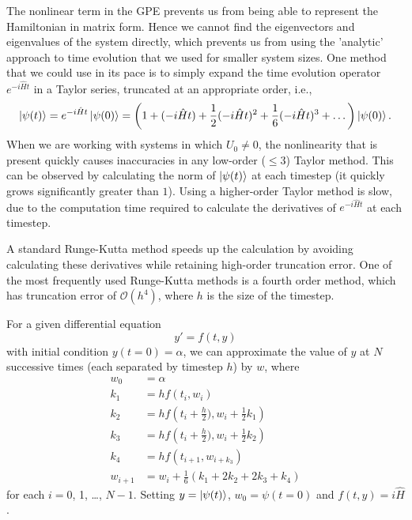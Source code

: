 \documentclass[a4paper, 10pt]{article}
\theoremstyle{plain}
\begin{document}
The nonlinear term in the GPE prevents us from being able to represent the
Hamiltonian in matrix form. Hence we cannot find the eigenvectors and
eigenvalues of the system directly, which prevents us from using the 'analytic'
approach to time evolution that we used for smaller system sizes. One method
that we could use in its pace is to simply expand the time evolution operator
$e^{-i \hat{H} t}$ in a Taylor series, truncated at an appropriate order, i.e.,
\begin{equation}
    \ket{\psi(t)}
    =
    e^{-i\hat{H}t}\ket{\psi(0)}
    =
    \left (
        1 + (-i \hat{H} t) + \frac{1}{2}(-i \hat{H} t)^{2} +
        \frac{1}{6}(-i \hat{H} t)^{3} + \dots
    \right)
    \ket{\psi(0)}.
\end{equation}
When we are working with systems in which $U_{0} \neq 0$, the nonlinearity that
is present quickly causes inaccuracies in any low-order ($\leq3$) Taylor method.
This can be observed by calculating the norm of $\ket{\psi(t)}$ at each timestep
(it quickly grows significantly greater than $1$). Using a higher-order Taylor
method is slow, due to the computation time required to calculate the
derivatives of $e^{-i\hat{H}t}$ at each timestep.

A standard Runge-Kutta method speeds up the calculation by avoiding calculating
these derivatives while retaining high-order truncation error. One of the most
frequently used Runge-Kutta methods is a fourth order method, which has
truncation error of $\mathcal{O}(h^4)$, where $h$ is the size of the timestep.

For a given differential equation
\begin{equation}
    y' = f(t,y)
\end{equation}
with initial condition $y(t=0) = \alpha$, we can approximate the value of $y$ at
$N$ successive times (each separated by timestep $h$) by $w$, where
\begin{align*}
    w_{0}   &= \alpha
    \\
    k_{1}   &= hf(t_{i}, w_{i})
    \\
    k_{2}   &= hf \left( t_{i} + \frac{h}{2}), w_{i} + \frac{1}{2} k_{1} \right)
    \\
    k_{3}   &= hf \left( t_{i} + \frac{h}{2}), w_i+\frac{1}{2} k_{2} \right)
    \\
    k_{4}   &= hf (t_{i+1}, w_{i+k_{3}})
    \\
    w_{i+1} &= w_{i} + \frac{1}{6}(k_{1} + 2 k_{2} + 2 k_{3} + k_{4})
\end{align*}
for each $i = 0$, 1, \dots, $N-1$. Setting $y = \ket{\psi(t)}$, $w_{0} =
\psi(t=0)$ and $f(t,y) = i \hat{H}$.
\end{document}
